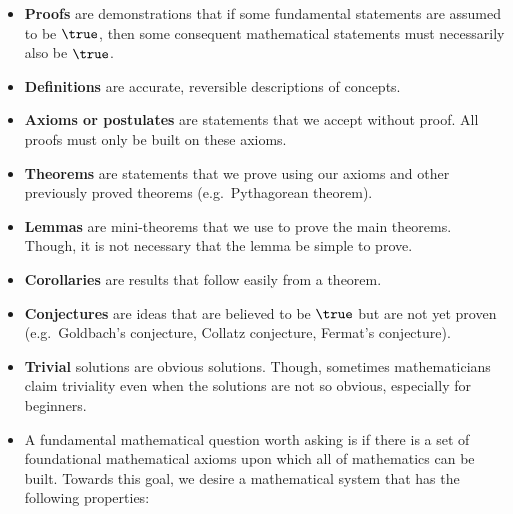 \begin{itemize}
\tightlist
\item
  \textbf{Proofs} are demonstrations that if some fundamental statements
  are assumed to be \(\true\), then some consequent mathematical
  statements must necessarily also be \(\true\).
\item
  \textbf{Definitions} are accurate, reversible descriptions of
  concepts.
\item
  \textbf{Axioms or postulates} are statements that we accept without
  proof. All proofs must only be built on these axioms.
\item
  \textbf{Theorems} are statements that we prove using our axioms and
  other previously proved theorems (e.g.~Pythagorean theorem).
\item
  \textbf{Lemmas} are mini-theorems that we use to prove the main
  theorems. Though, it is not necessary that the lemma be simple to
  prove.
\item
  \textbf{Corollaries} are results that follow easily from a theorem.
\item
  \textbf{Conjectures} are ideas that are believed to be \(\true\) but
  are not yet proven (e.g.~Goldbach's conjecture, Collatz conjecture,
  Fermat's conjecture).
\item
  \textbf{Trivial} solutions are obvious solutions. Though, sometimes
  mathematicians claim triviality even when the solutions are not so
  obvious, especially for beginners.
\item
  A fundamental mathematical question worth asking is if there is a set
  of foundational mathematical axioms upon which all of mathematics can
  be built. Towards this goal, we desire a mathematical system that has
  the following properties:


\end{itemize}
